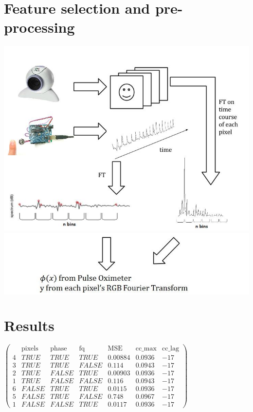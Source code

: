 \documentclass[a0,landscape]{a0poster}
\begin{document}
\begin{multicols}{4}
\section*{Feature selection and pre-processing}
\includegraphics{images/flow_chart_1.jpg}
\includegraphics{images/flow_chart_2.jpg}
\section*{Results}
 $\begin{pmatrix}
      	& \text{pixels} & \text{phase} & 	\text{fq} & 	\text{MSE} &  \text{cc\_max} &  \text{cc\_lag}  \\
    	4 &   TRUE &  TRUE &   TRUE & 0.00884 &  0.0936 & 	-17 \\
    	3 &   TRUE &  TRUE &  FALSE &   0.114 &  0.0943 & 	-17 \\
    	2 &   TRUE & FALSE &   TRUE & 0.00903 &  0.0936 & 	-17 \\
    	1 &   TRUE & FALSE &  FALSE &   0.116 &  0.0943 & 	-17 \\
    	6 &  FALSE &  TRUE &   TRUE &  0.0115 &  0.0936 & 	-17 \\
    	5 &  FALSE &  TRUE &  FALSE &   0.748 &  0.0967 & 	-17 \\
    	1 &  FALSE & FALSE &  TRUE  & 0.0117  & 0.0936  &	-17 	 
 \end{pmatrix}$



\end{multicols}
\end{document}
